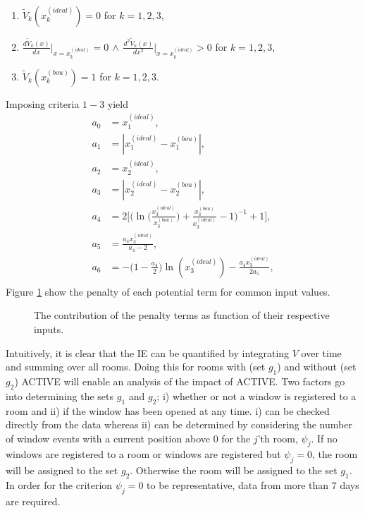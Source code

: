 \documentclass[fleqn,usenatbib,nofootinbib]{revtex4-2}
\begin{document}
	\begin{enumerate}
		\item $\tilde{V}_k(x_k^{(ideal)}) = 0$ for $k=1,2,3$,
		\item $\frac{d \tilde{V}_{k}(x)}{dx}\big|_{x= x_k^{(ideal)}} = 0 \, \wedge \, \frac{d^2 \tilde{V}_{k}(x)}{dx^2}\big|_{x=x_k^{(ideal)}} > 0 $ for $k=1,2,3$,
		\item $\tilde{V}_k(x_k^{(bou)}) = 1$ for $k=1,2,3$.
	\end{enumerate}
	Imposing criteria $1-3$ yield
	\begin{equation}
		\begin{split}
			a_0 &= x_1^{(ideal)},\\
			a_1 &=|x_1^{(ideal)}-x_1^{(bou)}|,\\
			a_2 &=x_2^{(ideal)},\\
			a_3 &=|x_2^{(ideal)}-x_2^{(bou)}|,\\
			a_4 &=2\bigg[\bigg(\ln\bigg(\frac{x_3^{(ideal)}}{x_3^{(bou)}}\bigg)+\frac{x_3^{(bou)}}{x_3^{(ideal)}}-1\bigg)^{-1}+1\bigg],\\
			a_5 &=\frac{a_4x_3^{(ideal)}}{a_4-2},\\
			a_6 &=-\big(1-\frac{a_4}{2}\big)\ln(x_3^{(ideal)})-\frac{a_4x_3^{(ideal)}}{2a_5},\\
		\end{split}
	\end{equation}
	Figure \ref{fig:s1} show the penalty of each potential term for common input values.
	\begin{figure}[h]
		\caption{\label{fig:s1} The contribution of the penalty terms as function of their respective inputs.}
	\end{figure}
	Intuitively, it is clear that the IE can be quantified by integrating $V$ over time and summing over all rooms. Doing this for rooms with (set $g_1$) and without (set $g_2$) ACTIVE will enable an analysis of the impact of ACTIVE. Two factors go into determining the sets $g_1$ and $g_2$; i) whether or not a window is registered to a room and ii) if the window has been opened at any time. i) can be checked directly from the data whereas ii) can be determined by considering the number of window events with a current position above $0$ for the $j$'th room, $\psi_{j}$. If no windows are registered to a room or windows are registered but $\psi_{j}=0$, the room will be assigned to the set $g_2$. Otherwise the room will be assigned to the set $g_1$. In order for the criterion $\psi_{j}=0$ to be representative, data from more than $7$ days are required. \newline
\end{document}
